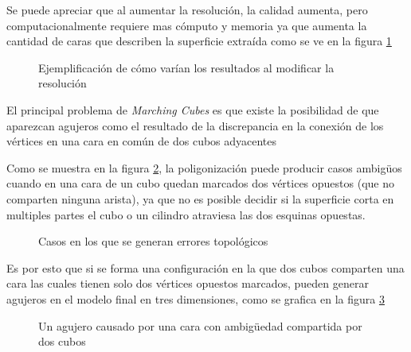 Se puede apreciar que al aumentar la resolución, la calidad aumenta, pero
computacionalmente requiere mas cómputo y memoria ya que aumenta la cantidad de caras que
describen la superficie extraída como se ve en la figura \ref{f:estadoDelArte:polygonise3}

\begin{figure}[!ht]
\centering
\caption{Ejemplificación de cómo varían los resultados al modificar la resolución}
\label{f:estadoDelArte:polygonise3}
\end{figure}

El principal problema de \emph{Marching Cubes} es que existe la posibilidad de que aparezcan agujeros como el resultado de la discrepancia en la conexión de los vértices en una cara en común de dos cubos adyacentes \cite{Chernyaev95marchingcubes}

Como se muestra en la figura \ref{f:estadoDelArte:Bloomenthal88polygonizationof_1}, la poligonización puede producir casos ambigüos cuando en una cara de un cubo quedan marcados dos vértices opuestos (que no comparten ninguna arista), ya que no es posible decidir si la superficie corta en multiples partes el cubo o un cilindro atraviesa las dos esquinas opuestas.

\begin{figure}[t]
\centering
\caption{Casos en los que se generan errores topológicos}
\label{f:estadoDelArte:Bloomenthal88polygonizationof_1}
\end{figure}

Es por esto que si se forma una configuración en la que dos cubos comparten una cara las cuales tienen solo dos vértices opuestos marcados, pueden generar agujeros en el modelo final en tres dimensiones, como se grafica en la figura \ref{f:estadoDelArte:Chernyaev95marchingcubes_1}

\begin{figure}[!htb]
\centering
\caption{Un agujero causado por una cara con ambigüedad compartida por dos cubos \cite{Chernyaev95marchingcubes}}
\label{f:estadoDelArte:Chernyaev95marchingcubes_1}
\end{figure}

